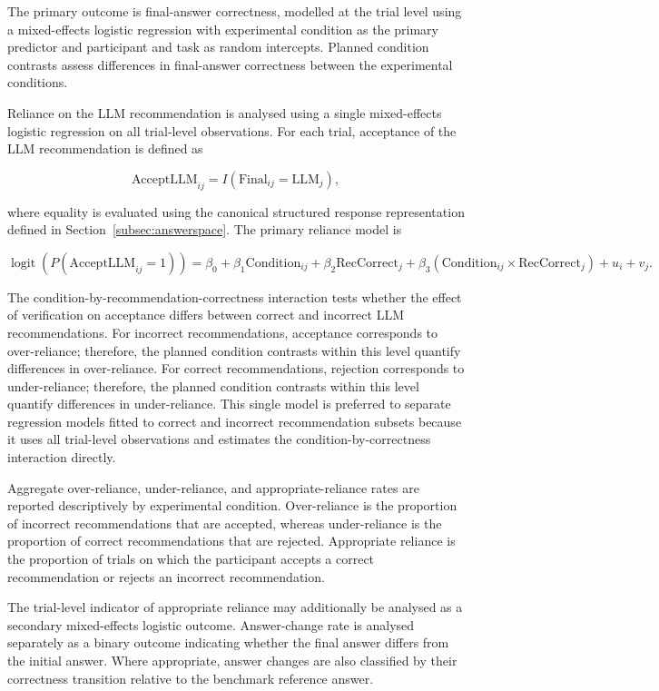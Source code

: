 \documentclass[oneside,final,14pt,a4paper]{extreport}
\begin{document}
The primary outcome is final-answer correctness, modelled at the trial level
using a mixed-effects logistic regression with experimental condition as the
primary predictor and participant and task as random intercepts. Planned
condition contrasts assess differences in final-answer correctness between
the experimental conditions.

Reliance on the LLM recommendation is analysed using a single mixed-effects
logistic regression on all trial-level observations. For each trial,
acceptance of the LLM recommendation is defined as

$$
\text{AcceptLLM}_{ij}
=
I(\text{Final}_{ij}=\text{LLM}_{j}),
$$

where equality is evaluated using the canonical structured response
representation defined in Section~\ref{subsec:answerspace}. The primary
reliance model is

$
\operatorname{logit}\!\left(
P(\text{AcceptLLM}_{ij}=1)
\right)
=
\beta_0
+
\beta_1\text{Condition}_{ij}
+
\beta_2\text{RecCorrect}_{j}
+
\beta_3
\left(
\text{Condition}_{ij}
\times
\text{RecCorrect}_{j}
\right)
+
u_i
+
v_j.
$

The condition-by-recommendation-correctness interaction tests whether the
effect of verification on acceptance differs between correct and incorrect
LLM recommendations. For incorrect recommendations, acceptance corresponds
to over-reliance; therefore, the planned condition contrasts within this
level quantify differences in over-reliance. For correct recommendations,
rejection corresponds to under-reliance; therefore, the planned condition
contrasts within this level quantify differences in under-reliance. This
single model is preferred to separate regression models fitted to correct and
incorrect recommendation subsets because it uses all trial-level observations
and estimates the condition-by-correctness interaction directly.

Aggregate over-reliance, under-reliance, and appropriate-reliance rates are
reported descriptively by experimental condition. Over-reliance is the
proportion of incorrect recommendations that are accepted, whereas
under-reliance is the proportion of correct recommendations that are
rejected. Appropriate reliance is the proportion of trials on which the
participant accepts a correct recommendation or rejects an incorrect
recommendation.

The trial-level indicator of appropriate reliance may additionally be
analysed as a secondary mixed-effects logistic outcome. Answer-change rate is
analysed separately as a binary outcome indicating whether the final answer
differs from the initial answer. Where appropriate, answer changes are also
classified by their correctness transition relative to the benchmark
reference answer.
\end{document}

